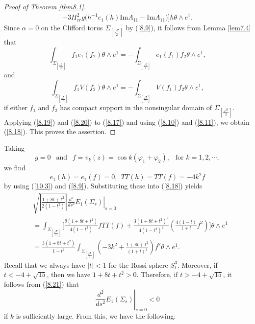 \documentclass{amsart}
\theoremstyle{Corollary}
\numberwithin{equation}{section}
\begin{document}
\begin{proof}[Proof of Theorem \ref{thm8.1}]
\begin{equation}
\begin{split}
+3H_{cr}^2g\big(h^{-1}e_1(h)\mbox{Im}A_{11}-\mbox{Im}A_{11}\big)\Bigg]h\theta\wedge e^1.
\end{split}
\end{equation}
Since $\alpha=0$ on the Clifford torus $\Sigma_{[\frac{\sqrt{2}}{2}]}$
by (\ref{8.9}), it follows from Lemma \ref{lem7.4} that 
\begin{equation}\label{8.19}
\int_{\Sigma_{[\frac{\sqrt{2}}{2}]}} f_1 e_1(f_2)\theta\wedge e^1=-\int_{\Sigma_{[\frac{\sqrt{2}}{2}]}} e_1(f_1) f_2\theta\wedge e^1,
\end{equation}
and 
\begin{equation}\label{8.20}
\int_{\Sigma_{[\frac{\sqrt{2}}{2}]}} f_1 V(f_2)\theta\wedge e^1=-\int_{\Sigma_{[\frac{\sqrt{2}}{2}]}}V(f_1)f_2\theta\wedge e^1,
\end{equation}
if either $f_1$ and $f_2$ has compact support in the nonsingular domain of $\Sigma_{[\frac{\sqrt{2}}{2}]}$. 
Applying (\ref{8.19}) and (\ref{8.20}) to (\ref{8.17}) 
and using  (\ref{8.10}) and (\ref{8.11}), we 
obtain (\ref{8.18}). 
This proves the assertion.   
\end{proof}
 
 
Taking
$$g=0~~\mbox{ and }~~f=v_k(z)=\cos k(\varphi_1+\varphi_2),~~\mbox{ for }k=1,2,\cdots,$$
we find 
\begin{equation*}
e_1(h)=e_1(f)=0,~~TT(h)=TT(f)=-4k^2f
\end{equation*}
by using (\ref{10.3}) and (\ref{8.9}). 
Substituting these into (\ref{8.18}) yields 
\begin{equation}\label{8.21}
\begin{split}
&\sqrt{\left|\frac{1+8t+t^2}{2(1-t^2)}\right|}\left.\frac{d^2}{ds^2}E_1(\Sigma_s)\right|_{s=0}\\ &=
\int_{\Sigma_{[\frac{\sqrt{2}}{2}]}}
\Bigg[\frac{9(1+8t+t^2)}{4(1-t^2)}fTT(f)
+\frac{3(1+8t+t^2)^2}{4(1-t^2)^2}\left(\frac{4(1-t)}{1+t}f^2\right)
\Bigg]\theta\wedge e^1\\
&=\frac{3(1+8t+t^2)}{1-t^2}
\int_{\Sigma_{[\frac{\sqrt{2}}{2}]}}
\left(-3k^2
+\frac{1+8t+t^2}{(1+t)^2} 
\right)f^2\theta\wedge e^1.
\end{split}
\end{equation}
Recall that we always have $|t|<1$
for the Rossi sphere $S^3_t$. 
Moreover, if $t<-4+\sqrt{15}$, then we have 
$1+8t+t^2>0$. Therefore, if $t>-4+\sqrt{15}$, 
it follows from (\ref{8.21}) that 
$$\left.\frac{d^2}{ds^2}E_1(\Sigma_s)\right|_{s=0}<0$$
if $k$ is sufficiently large. From this, we have the following: 
\end{document}
